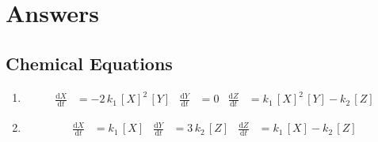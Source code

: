 \documentclass[11pt]{article}
\newcommand{\dd}{\mathrm{d}}
\begin{document}
\section{Answers}
\label{sec:orgadb3bfa}

\subsection{Chemical Equations}
\label{sec:org5272f73}
\begin{enumerate}
\item \begin{align*}
 \frac{\dd X}{\dd t} &= -2\,k_1\,[X]^2\,[Y]  &
 \frac{\dd Y}{\dd t} &= 0 &
 \frac{\dd Z}{\dd t} & = k_1\,[X]^2\,[Y]  - k_2 \, [Z]
\end{align*}
\item \begin{align*}
\frac{\dd X}{\dd t} &= k_1\, [X] &
\frac{\dd Y}{\dd t} &= 3\,k_2 \,[Z] &
\frac{\dd Z}{\dd t} &=  k_1\, [X] - k_2 \,[Z]
\end{align*}
\end{enumerate}
\end{document}
